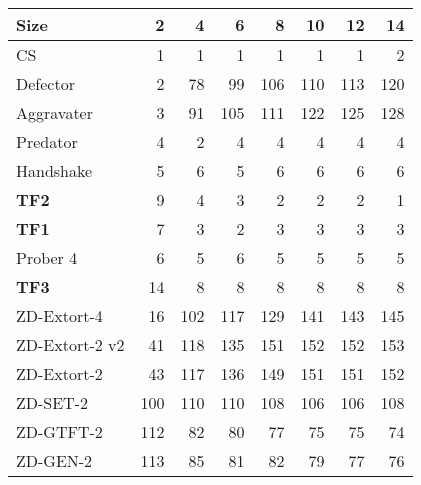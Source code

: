\begin{tabular}{lrrrrrrr}
\toprule
           Size &      2 &      4 &      6 &      8 &     10 &     12 &     14 \\
\midrule
             CS &    1 &    1 &    1 &    1 &    1 &    1 &    2 \\
       Defector &    2 &   78 &   99 &  106 &  110 &  113 &  120 \\
     Aggravater &    3 &   91 &  105 &  111 &  122 &  125 &  128 \\
       Predator &    4 &    2 &    4 &    4 &    4 &    4 &    4 \\
      Handshake &    5 &    6 &    5 &    6 &    6 &    6 &    6 \\
\midrule
            \textbf{TF2} &    9 &    4 &    3 &    2 &    2 &    2 &    1 \\
            \textbf{TF1} &    7 &    3 &    2 &    3 &    3 &    3 &    3 \\
       Prober 4 &    6 &    5 &    6 &    5 &    5 &    5 &    5 \\
\midrule
            \textbf{TF3} &   14 &    8 &    8 &    8 &    8 &    8 &    8 \\
\midrule
    ZD-Extort-4 &   16 &  102 &  117 &  129 &  141 &  143 &  145 \\
 ZD-Extort-2 v2 &   41 &  118 &  135 &  151 &  152 &  152 &  153 \\
    ZD-Extort-2 &   43 &  117 &  136 &  149 &  151 &  151 &  152 \\
       ZD-SET-2 &  100 &  110 &  110 &  108 &  106 &  106 &  108 \\
      ZD-GTFT-2 &  112 &   82 &   80 &   77 &   75 &   75 &   74 \\
       ZD-GEN-2 &  113 &   85 &   81 &   82 &   79 &   77 &   76 \\
\bottomrule
\end{tabular}